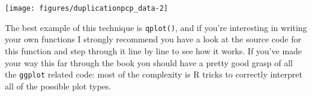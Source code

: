 \begin{Shaded}
\begin{Highlighting}[]
\NormalTok{>}\StringTok{ }\StringTok{ }\NormalTok{(} 
\end{Highlighting}
\end{Shaded}

\texttt{[image: figures/duplicationpcp\_data-2]}

The best example of this technique is \texttt{qplot()}, and if you're
interesting in writing your own functions I strongly recommend you have
a look at the source code for this function and step through it line by
line to see how it works. If you've made your way this far through the
book you should have a pretty good grasp of all the \texttt{ggplot}
related code: most of the complexity is R tricks to correctly interpret
all of the possible plot types.
